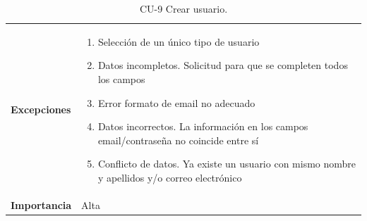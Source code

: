 \begin{table}[p]
\begin{tabularx}{\linewidth}{ p{} p{} }
		\textbf{Excepciones}          & 
            \begin{enumerate}
    			\def\labelenumi{\arabic{enumi}.}
    			\tightlist
    			\item Selección de un único tipo de usuario 
                \item Datos incompletos. Solicitud para que se completen todos los campos 
                \item Error formato de email no adecuado
                \item Datos incorrectos. La información en los campos email/contraseña no coincide entre sí
                \item Conflicto de datos. Ya existe un usuario con mismo nombre y apellidos y/o correo electrónico
    		\end{enumerate}\\
		\textbf{Importancia}          & Alta \\
		\bottomrule
	\end{tabularx}
	\caption{CU-9 Crear usuario.}
\end{table}

